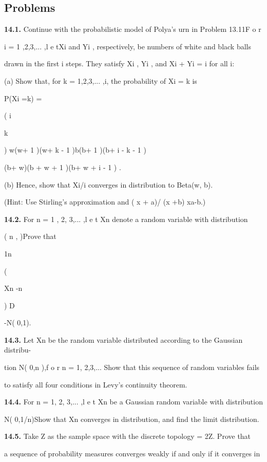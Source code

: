 \subsection*{Problems}

\textbf{14.1.} Continue with the probabilistic model of Polya's urn in Problem 13.11F o r

i = 1 ,2,3,... ,l e tXi and Yi , respectively, be numbers of white and black balls

drawn in the first i steps. They satisfy Xi , Yi , and Xi + Yi = i for all i:

(a) Show that, for k = 1,2,3,... ,i, the probability of Xi = k is

P(Xi =k) =

( i

k

) w(w+ 1 )\cdot\cdot\cdot (w+ k - 1 )b(b+ 1 )\cdot\cdot\cdot (b+ i - k - 1 )

(b+ w)(b + w + 1 )\cdot\cdot\cdot (b+ w + i - 1 ) .

(b) Hence, show that Xi/i converges in distribution to Beta(w, b).

(Hint: Use Stirling's approximation and ( x + a)/ (x +b) xa-b.)

\textbf{14.2.} For n = 1 , 2, 3,... ,l e t Xn denote a random variable with distribution

( n \alpha , \beta)Prove that

1\sqrt n\alpha\beta

(

Xn -n\alpha\beta

) D

-\to N( 0,1).

\textbf{14.3.} Let Xn be the random variable distributed according to the Gaussian distribu-

tion N( 0,n ),f o r n = 1, 2,3,... Show that this sequence of random variables fails

to satisfy all four conditions in Levy's continuity theorem.

\textbf{14.4.} For n = 1, 2, 3,... ,l e t Xn be a Gaussian random variable with distribution

N( 0,1/n)Show that Xn converges in distribution, and find the limit distribution.

\textbf{14.5.} Take Z as the sample space with the discrete topology = 2Z. Prove that

a sequence of probability measures converges weakly if and only if it converges in

